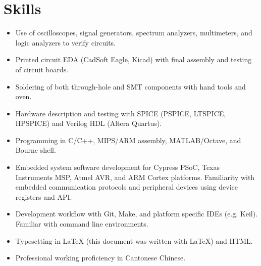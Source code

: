 \documentclass[10pt]{article}
\begin{document}
\section{Skills}
\begin{adjustwidth}{16pt}{0pt}
\begin{itemize}
	\setlength\itemsep{0pt}
	\item Use of oscilloscopes, signal generators, spectrum analyzers,
	multimeters, and logic analyzers to verify circuits.
	\item Printed circuit EDA (CadSoft Eagle, Kicad) with final assembly and
	testing of circuit boards.
	\item Soldering of both through-hole and SMT components with hand tools and
	oven.
	\item Hardware description and testing with SPICE (PSPICE, LTSPICE, HPSPICE)
	and Verilog HDL (Altera Quartus).
	\item Programming in C/C++, MIPS/ARM assembly, MATLAB/Octave, and Bourne
	shell.
	\item Embedded system software development for Cypress PSoC, Texas Instruments
	MSP, Atmel AVR, and ARM Cortex platforms. Familiarity with embedded
	communication protocols and peripheral devices using device registers and API.
	\item Development workflow with Git, Make, and platform specific IDEs (e.g.
	Keil). Familiar with command line environments.
	\item Typesetting in \LaTeX \hspace{3pt} (this document was written with
	\LaTeX) and HTML.
	\item Professional working proficiency in Cantonese Chinese.
\end{itemize}
\end{adjustwidth}
\end{document}
